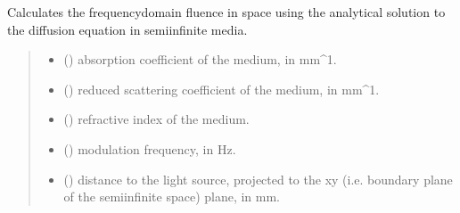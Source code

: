 \documentclass[letterpaper,10pt,english]{sphinxmanual}
\begin{document}
\begin{fulllineitems}
\label{\detokenize{_autosummary/nirfasterff.forward.analytical.semi_infinite_FD:nirfasterff.forward.analytical.semi_infinite_FD}}
\pysigstartsignatures
\pysiglinewithargsret
{}
{\sphinxparamcomma {}\sphinxparamcomma {}\sphinxparamcomma {}\sphinxparamcomma {}\sphinxparamcomma {}\sphinxparamcomma {}\sphinxparamcomma {}}
{}
\pysigstopsignatures
\sphinxAtStartPar
Calculates the frequency\sphinxhyphen{}domain fluence in space using the analytical solution to the diffusion equation in semi\sphinxhyphen{}infinite media.
\begin{quote}\begin{description}
\begin{itemize}
\item {} 
\sphinxAtStartPar
{} () \textendash{} absorption coefficient of the medium, in mm\textasciicircum{}\sphinxhyphen{}1.

\item {} 
\sphinxAtStartPar
{} () \textendash{} reduced scattering coefficient of the medium, in mm\textasciicircum{}\sphinxhyphen{}1.

\item {} 
\sphinxAtStartPar
{} () \textendash{} refractive index of the medium.

\item {} 
\sphinxAtStartPar
{} () \textendash{} modulation frequency, in Hz.

\item {} 
\sphinxAtStartPar
{} () \textendash{} 
\sphinxAtStartPar
distance to the light source, projected to the x\sphinxhyphen{}y (i.e. boundary plane of the semi\sphinxhyphen{}infinite space) plane, in mm.


\end{itemize}
\end{description}
\end{quote}
\end{fulllineitems}
\end{document}
